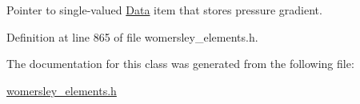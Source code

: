 Pointer to single-\/valued \hyperlink{classoomph_1_1Data}{Data} item that stores pressure gradient. 



Definition at line 865 of file womersley\+\_\+elements.\+h.



The documentation for this class was generated from the following file\+:\begin{DoxyCompactItemize}
\item 
\hyperlink{womersley__elements_8h}{womersley\+\_\+elements.\+h}\end{DoxyCompactItemize}
